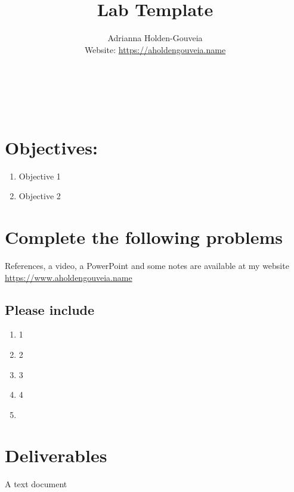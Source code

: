 \documentclass[12pt]{article}
\title{Lab Template}
\author{
        Adrianna Holden-Gouveia \\
        Website: \url{https://aholdengouveia.name}\\ 
        \date{\vspace{-5ex}}
        \faLinkedin{: aholdengouveia} \\
        \faGithub {: aholdengouveia} \\
        \faTwitter {: aholdengouveia} \\
        }
\begin{document}
    

\maketitle


\section*{Objectives:}
\begin{enumerate}
    \item Objective 1
    \item Objective 2
\end{enumerate}
\section*{Complete the following problems}

References, a video, a PowerPoint and some notes are available at my website
\url {https://www.aholdengouveia.name}

\subsection*{Please include}
    \begin{enumerate}
        \item 1
        \item 2
        \item 3
        \item 4
        \item 


    \end{enumerate}



\section*{Deliverables}
A text document 
\end{document}
